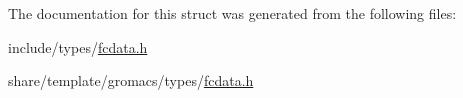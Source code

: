 \-The documentation for this struct was generated from the following files\-:\begin{DoxyCompactItemize}
\item 
include/types/\hyperlink{include_2types_2fcdata_8h}{fcdata.\-h}\item 
share/template/gromacs/types/\hyperlink{share_2template_2gromacs_2types_2fcdata_8h}{fcdata.\-h}\end{DoxyCompactItemize}
